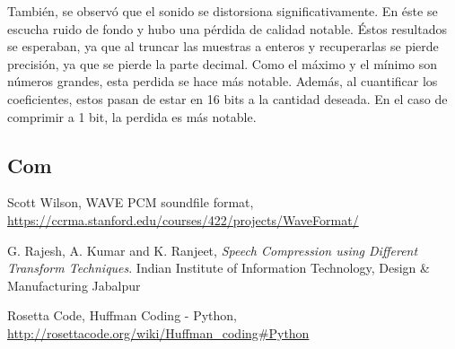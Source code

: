 \documentclass[12pt,a4paper]{article}
\begin{document}
    También, se observó que el sonido se distorsiona significativamente. En éste se escucha ruido de fondo y hubo una pérdida de calidad notable. Éstos resultados se esperaban, ya que al truncar las muestras a enteros y recuperarlas se pierde precisión, ya que se pierde la parte decimal. Como el máximo y el mínimo son números grandes, esta perdida se hace más notable. Además, al cuantificar los coeficientes, estos pasan de estar en 16 bits a la cantidad deseada. En el caso de comprimir a 1 bit, la perdida es más notable.
    \subsection{Com}
 
\clearpage

\renewcommand\refname{Referencias}
\begin{thebibliography}{9}

  Scott Wilson,
  WAVE PCM soundfile format,
  \url{https://ccrma.stanford.edu/courses/422/projects/WaveFormat/}

  G. Rajesh, A. Kumar and K. Ranjeet,
  \emph{Speech Compression using Different Transform Techniques}.
  Indian Institute of Information Technology, Design \& Manufacturing Jabalpur

  Rosetta Code,
  Huffman Coding - Python,
  \url{http://rosettacode.org/wiki/Huffman_coding#Python}

\end{thebibliography}
\end{document}
